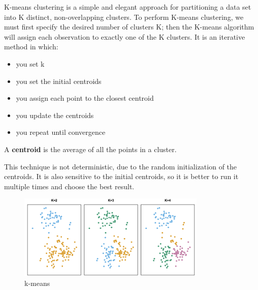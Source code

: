 \begin{definitionblock}[k-means]
K-means clustering is a simple and elegant approach for partitioning a data set into K distinct, non-overlapping clusters. To perform K-means clustering, we must first specify the desired number of clusters K; then the K-means algorithm will assign each observation to exactly one of the K clusters.
It is an iterative method in which:
\begin{itemize}
    \item you set k
    \item you set the initial centroids
    \item you assign each point to the closest centroid
    \item you update the centroids
    \item you repeat until convergence
\end{itemize}
A \textbf{centroid} is the average of all the points in a cluster.
\end{definitionblock}

This technique is not deterministic, due to the random initialization of the centroids. It is also sensitive to the initial centroids, so it is better to run it multiple times and choose the best result.

\begin{figure}[H]
    \centering
    \includegraphics[width=0.8\textwidth]{assets/fig38.png}
    \caption{k-means}
\end{figure}
